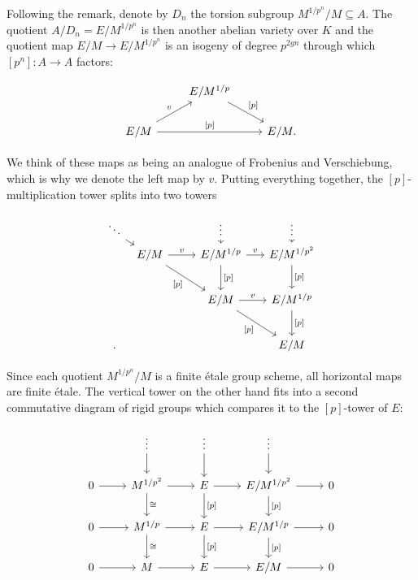 \documentclass[10pt,oneside]{amsart}
\theoremstyle{definition}
\theoremstyle{remark}
\begin{document}
	Following the remark, denote by $D_n$ the torsion subgroup $M^{1/p^n}/M\subseteq A$. The quotient $A/D_n = E/M^{1/p^n}$ is then another abelian variety over $K$ and the quotient map $E/M\rightarrow E/M^{1/p^n}$ is an isogeny of degree $p^{2gn}$  through which  $[p^n]:A\rightarrow A$ factors: 
		\begin{center}
			\begin{equation}\label{factorisation of [p] over E/M}
			\begin{tikzcd}
				& E/M^{1/p} \arrow[rd, "{[p]}"] &  \\
				E/M \arrow[rr, "{[p]}"] \arrow[ru,"v"] &  & E/M.
			\end{tikzcd}
			\end{equation}
		\end{center}
		We think of these maps as being an analogue of Frobenius and Verschiebung, which is why we denote the left map by $v$.
		Putting everything together, the $[p]$-multiplication tower splits into two towers
		\begin{center}
		\begin{equation}\label{p-multiplication tower of E/M splits into vertical and horizontal tower}
		\begin{tikzcd}[column sep={1.1cm,between origins},row sep={0.7cm,between origins}]
			\ddots \arrow[rd] &  &  & \vdots \arrow[d] &  & \vdots \arrow[d] \\
			& E/M \arrow[rr,"v"] \arrow[rrdd, "{[p]}"'] &  & E/M^{1/p} \arrow[rr,"v"] \arrow[dd,"{[p]}"] &  & E/M^{1/p^2} \arrow[dd,"{[p]}"] \\
			&  &  &  &  &  \\
			&  &  & E/M \arrow[rrdd, "{[p]}"'] \arrow[rr,"v"] &  & E/M^{1/p} \arrow[dd,"{[p]}"] \\
			&  &  &  &  &  \\.
			&  &  &  &  & E/M
		\end{tikzcd}
		\end{equation}
		\end{center}
		Since each quotient $M^{1/p^n}/M$ is a finite \'etale group scheme, all horizontal maps are finite \'etale. The vertical tower on the other hand fits into a second commutative diagram of rigid groups which compares it to the $[p]$-tower of $E$:
		
		\begin{center}
		\begin{equation}\label{F-tower for E/M}
		\begin{tikzcd}
			& \vdots \arrow[d] & \vdots \arrow[d] & \vdots \arrow[d] &  \\
			0 \arrow[r] & M^{1/p^2} \arrow[d, "\cong"] \arrow[r] & E \arrow[d, "{[p]}"] \arrow[r] & E/M^{1/p^2} \arrow[d, "{[p]}"] \arrow[r] & 0 \\
			0 \arrow[r] & M^{1/p} \arrow[d, "\cong"] \arrow[r] & E \arrow[d, "{[p]}"] \arrow[r] & E/M^{1/p} \arrow[d, "{[p]}"] \arrow[r] & 0 \\
			0 \arrow[r] & M \arrow[r] & E \arrow[r] & E/M \arrow[r] & 0
		\end{tikzcd}
		\end{equation}
		\end{center}
		
\end{document}
